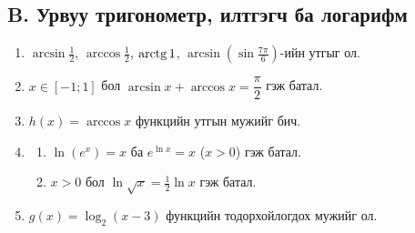 \subsection*{B. Урвуу тригонометр, илтгэгч ба логарифм}
\begin{enumerate}[resume]
\item $\arcsin\frac12$, \; $\arccos\frac12$, \; $\operatorname{arctg}1$, \; $\arcsin\!\left(\sin\frac{7\pi}{6}\right)$-ийн утгыг ол.
\item $x\in[-1;1]$ бол $\arcsin x+\arccos x=\dfrac{\pi}{2}$ гэж батал.
\item $h(x)=\arccos x$ функцийн утгын мужийг бич.
\item
\begin{enumerate}[label=\alph*)]
  \item $\ln(e^x)=x$ ба $e^{\ln x}=x$ ($x>0$) гэж батал.
  \item $x>0$ бол $\ln\sqrt{x}=\frac12\ln x$ гэж батал.
\end{enumerate}
\item $g(x)=\log_2(x-3)$ функцийн тодорхойлогдох мужийг ол.
\end{enumerate}

